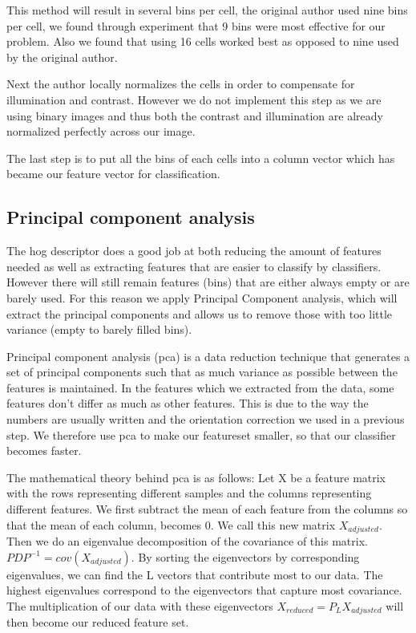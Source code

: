 \documentclass[%
        compressed,
        final,
        notitlepage,
        narroweqnarray,
        inline,
        twoside,
        ]{ieee}
\begin{document}
This method will result in several bins per cell, the original author used nine
bins per cell, we found through experiment that 9 bins were most effective for
our problem. Also we found that using 16 cells worked best as opposed to nine used by the original author.

Next the author locally normalizes the cells in order to compensate for illumination and contrast. However we do not implement this step as we are using binary images and thus both the contrast and illumination are already normalized perfectly across our image.

The last step is to put all the bins of each cells into a column vector which has became our feature vector for classification.


\subsection{Principal component analysis}
The hog descriptor does a good job at both reducing the amount of features needed as well as extracting features that are easier to classify by classifiers. However there will still remain features (bins) that are either always empty or are barely used. For this reason we apply Principal Component analysis, which will extract the principal components and allows us to remove those with too little variance (empty to barely filled bins).

Principal component analysis (pca) is a data reduction technique that generates a set of
principal components such that as much variance as possible between the features is maintained.  In the features which we extracted from the data, some features don't differ as much as other features. This is due to the way the numbers are usually written and the orientation correction we used in a previous step. We therefore use pca to make our featureset smaller, so that our classifier becomes faster.

The mathematical theory behind pca is as follows:
Let X be a feature matrix with the rows representing different samples and the
columns representing different features.  We first subtract the mean of each
feature from the columns so that the mean of each column, becomes 0. We call
this new matrix $X_{adjusted}$. Then we do an eigenvalue decomposition of the
covariance of this matrix. $PDP^{-1}=cov(X_{adjusted})$. By sorting the
eigenvectors by corresponding eigenvalues, we can find the L vectors that
contribute most to our data.  The highest eigenvalues correspond to the
eigenvectors that capture most covariance. The multiplication of our data with
these eigenvectors $X_{reduced}=P_L X_{adjusted}$ will then become our reduced feature set.
\cite{Pearson}
\end{document}
